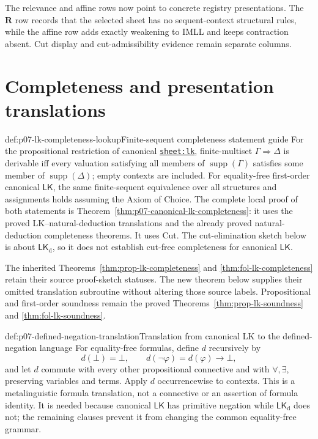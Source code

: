 The relevance and affine rows now point to concrete registry presentations.
The \(\mathbf R\) row records that the selected sheet has no sequent-context
structural rules, while the affine row adds exactly weakening to IMLL and keeps
contraction absent. Cut display and cut-admissibility evidence remain separate
columns.

\section{Completeness and presentation translations}

\begin{hbmethod}{def:p07-lk-completeness-lookup}{Finite-sequent completeness statement guide}
For the propositional restriction of canonical
\hyperref[sheet:lk]{\texttt{sheet:lk}}, finite-multiset
\(\Gamma\Rightarrow\Delta\) is derivable iff every valuation satisfying all
members of \(\operatorname{supp}(\Gamma)\) satisfies some member of
\(\operatorname{supp}(\Delta)\); empty contexts are included.  For equality-free
first-order canonical \(\mathsf{LK}\), the same finite-sequent equivalence
over all structures and assignments holds assuming the Axiom of Choice.
The complete local proof of both statements is
Theorem~\ref{thm:p07-canonical-lk-completeness}: it uses the proved
LK--natural-deduction translations and the already proved natural-deduction
completeness theorems.  It uses Cut.  The cut-elimination sketch below is about
\(\mathsf{LK}_{\mathrm d}\), so it does not establish cut-free completeness
for canonical \(\mathsf{LK}\).
\end{hbmethod}

The inherited Theorems~\ref{thm:prop-lk-completeness} and
\ref{thm:fol-lk-completeness} retain their source proof-sketch statuses.  The
new theorem below supplies their omitted translation subroutine without
altering those source labels.  Propositional and first-order soundness remain
the proved Theorems~\ref{thm:prop-lk-soundness} and
\ref{thm:fol-lk-soundness}.

\begin{hbdefinition}{def:p07-defined-negation-translation}{Translation from canonical LK to the defined-negation language}
For equality-free formulas, define \(d\) recursively by
\[
 d(\bot)=\bot,\qquad d(\neg\varphi)=d(\varphi)\to\bot,
\]
and let \(d\) commute with every other propositional connective and with
\(\forall,\exists\), preserving variables and terms.  Apply \(d\)
occurrencewise to contexts.  This is a metalinguistic formula translation,
not a connective or an assertion of formula identity.  It is needed because
canonical \(\mathsf{LK}\) has primitive negation while
\(\mathsf{LK}_{\mathrm d}\) does not; the remaining clauses prevent it from
changing the common equality-free grammar.
\end{hbdefinition}

